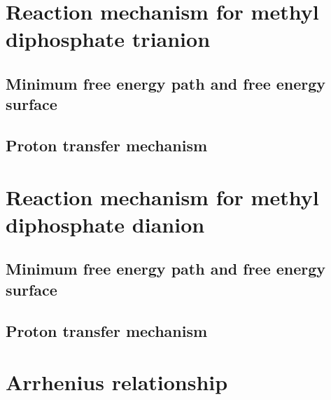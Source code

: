 

\section{Reaction mechanism for methyl diphosphate trianion}
\subsection{Minimum free energy path and free energy surface}
\subsection{Proton transfer mechanism}




\section{Reaction mechanism for methyl diphosphate dianion}
\subsection{Minimum free energy path and free energy surface}
\subsection{Proton transfer mechanism}




\section{Arrhenius relationship}




